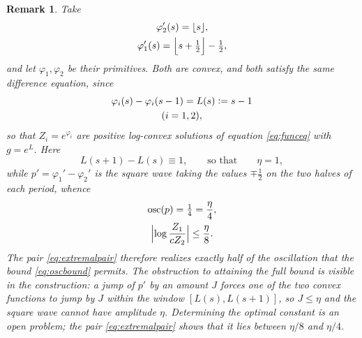 \documentclass[sn-mathphys-num]{sn-jnl}
\theoremstyle{thmstyleone}%
\theoremstyle{thmstyletwo}%
\newtheorem{remark}{Remark}%
\theoremstyle{thmstylethree}%
\theoremstyle{thmstyleone}%
\providecommand{\osc}{\operatorname{osc}}
\providecommand{\eqdef}{\mathrel{\vcentcolon=}}
\begin{document}
\begin{appendices}
		\begin{remark}\label{rem:notsharp}
			Take
			\begin{equation}\label{eq:extremalpair}
				\begin{gathered}
					\varphi_2'(s)=\lfloor s\rfloor,\\
					\varphi_1'(s)=\Bigl\lfloor s+\tfrac12\Bigr\rfloor-\tfrac12 ,
				\end{gathered}
			\end{equation}
			and let $\varphi_1,\varphi_2$ be their primitives. Both are
			convex, and both satisfy the same difference equation, since
			\begin{equation}\label{eq:extremalL}
				\begin{gathered}
					\varphi_i(s)-\varphi_i(s-1)=L(s)\eqdef s-1\\
					(i=1,2),
				\end{gathered}
			\end{equation}
			so that $Z_i=e^{\varphi_i}$ are positive log-convex solutions of
			equation \eqref{eq:funceq} with $g=e^{L}$. Here
			\begin{equation}\label{eq:extremaleta}
				L(s+1)-L(s)\equiv1,
				\qquad\text{so that}\qquad
				\eta=1,
			\end{equation}
			while
			$p'=\varphi_1'-\varphi_2'$ is the square wave taking the values
			$\mp\tfrac12$ on the two halves of each period, whence
			\begin{equation}\label{eq:extremalosc}
				\begin{gathered}
					\osc(p)=\tfrac14=\frac{\eta}{4},\\
					\Bigl|\log\frac{Z_1}{cZ_2}\Bigr|\le\frac{\eta}{8} .
				\end{gathered}
			\end{equation}
			The pair \eqref{eq:extremalpair} therefore realizes exactly half of
			the oscillation that the bound \eqref{eq:oscbound} permits. The
			obstruction to attaining the full bound is visible in the
			construction: a jump of $p'$ by an amount $J$ forces one of the two
			convex functions to jump by $J$ within the window
			$[L(s),L(s+1)]$, so $J\le\eta$ and the square wave cannot have
			amplitude $\eta$. Determining the optimal constant is an open
			problem; the pair \eqref{eq:extremalpair} shows that it lies
			between $\eta/8$ and $\eta/4$.
		\end{remark}
		
		
		\propinfoform*
		

\end{appendices}
\end{document}
